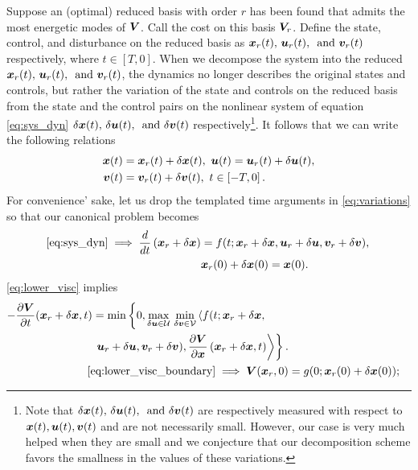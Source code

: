 Suppose an (optimal) reduced basis with order $r$ has been found that admits the most energetic modes of $\bm{V}$. Call the cost on this basis $\bm{V}_r$. Define the state, control, and disturbance on the reduced basis as $\bm{x}_r(t), \, \bm{u}_r(t), \, \text{ and } \bm{v}_r(t)$ respectively, where $t \in \left[T, 0\right]$. When we decompose the system into the reduced  $\bm{x}_r(t), \, \bm{u}_r(t), \, \text{ and } \bm{v}_r(t)$, the dynamics no longer describes the original states and controls, but rather the variation of the state and controls on the reduced basis from the state and the control pairs on the nonlinear system of equation \eqref{eq:sys_dyn} \ie $\delta \bm{x}(t), \, \delta \bm{u}(t), \,\text{ and } \delta \bm{v}(t)$ respectively\footnote{Note that $\delta \bm{x}(t), \, \delta \bm{u}(t), \,\text{ and } \delta \bm{v}(t)$ are respectively measured with respect to $\bm{x}(t), \bm{u}(t), \bm{v}(t)$ and are not necessarily small. However, our case is very much helped when they are small and we conjecture that our decomposition scheme favors the smallness in the values of these variations.}. It follows that we can write the following relations
%
\begin{subequations}
	\begin{align}
		\bm{x}(t) &= \bm{x}_r(t) + \delta\bm{x}(t), \,\, 	\bm{u}(t) = \bm{u}_r(t) + \delta\bm{u}(t), \\
		\bm{v}(t) &= \bm{v}_r(t) + \delta\bm{v}(t), \,\, t \in \left[-T, 0\right].
	\end{align}
	\label{eq:variations}
\end{subequations}
%
For convenience' sake, let us drop the templated time arguments in \eqref{eq:variations} so that our canonical problem becomes
%
\begin{subequations}
	\begin{align}
		\eqref{eq:sys_dyn} \implies \dfrac{d}{dt}\left(\bm{x}_r + \delta \bm{x}\right) &= f(t; \bm{x}_r + \delta \bm{x}, \bm{u}_r + \delta \bm{u}, \bm{v}_r + \delta \bm{v}), \,  \\
		& \bm{x}_r(0) + \delta \bm{x}(0) = \bm{x}(0).
	\end{align}
\end{subequations}
%
\eqref{eq:lower_visc} implies 
%
\begin{align}
	\begin{split}
		-\frac{\partial \valuefunc}{\partial t}(\state_r + \delta \state, t)
		&= 
		\min \left\{0,  
		\max_{\delta \control \in \mathcal{U}} \, \min_{\delta \disturb \in \mathcal{V}} \left\langle f(t; \state_r + \delta \state, \right. \right. \\
		&  \left. \left.  \control_r + \delta \control, \disturb_r + \delta \disturb), \dfrac{\partial \valuefunc}{\partial \state}\left(\state_r + \delta \state, t \right) \right\rangle \right\}. 
	\end{split} \nonumber \\
	\eqref{eq:lower_visc_boundary} \implies	\valuefunc(\state_r, 0) &= g(0; \state_r(0) + \delta \state (0));
	\label{eq:canonical_value}
\end{align}
